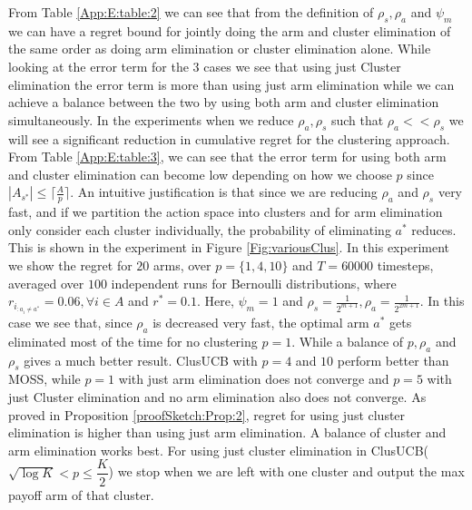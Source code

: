 \begin{remark}
\begin{table}
\begin{center}
\begin{tabular}{p{1.4cm}p{10.2cm}p{3.5cm}}
\end{tabular}
\end{center}	
\end{table}
 From Table \ref{App:E:table:2} we can see that from the definition of $\rho_{s},\rho_{a}$ and $\psi_{m}$ we can have a regret bound for jointly doing the arm and cluster elimination of the same order as doing arm elimination or cluster elimination alone. While looking at the error term for the $3$ cases we see that using just Cluster elimination  the error term is more than using just arm elimination while we can achieve a balance between the two by using both arm and cluster elimination simultaneously. In the experiments when we reduce $\rho_{a}, \rho_{s}$ such that $\rho_{a}<<\rho_{s}$ we will see a significant reduction in cumulative regret for the clustering approach. From Table \ref{App:E:table:3}, we can see that the error term for using both arm and cluster elimination can become low depending on how we choose $p$ since $|A_{s^{*}}|\leq \lceil\frac{A}{p}\rceil$. An intuitive justification is that since we are reducing $\rho_{a}$ and $\rho_{s}$ very fast, and if we partition the action space into clusters and for arm elimination only consider each cluster individually, the probability of eliminating $a^{*}$ reduces. 
 This is shown in the experiment in Figure \ref{Fig:variousClus}. In this experiment we show the regret for $20$ arms, over $p=\lbrace 1,4,10\rbrace$ and $T=60000$ timesteps, averaged over $100$ independent runs for Bernoulli distributions, where $r_{i_{:{a_{i}\neq a^{*}}}}=0.06,\forall i\in A$ and $r^{*}=0.1$. Here, $\psi_{m}=1$ and $\rho_{s}=\frac{1}{2^{m+1}},\rho_{a}=\frac{1}{2^{2m+1}}$. In this case we see that, since $\rho_{a}$ is decreased very fast, the optimal arm $a^{*}$ gets eliminated most of the time for no clustering $p=1$. While a balance of $p,\rho_{a}$ and $\rho_{s}$ gives a much better result. ClusUCB with $p=4$ and $10$ perform better than MOSS, while $p=1$ with just arm elimination does not converge and $p=5$ with just Cluster elimination and no arm elimination also does not converge. As proved in Proposition \ref{proofSketch:Prop:2}, regret for using just cluster elimination is higher than using just arm elimination. A balance of cluster and arm elimination works best. For using just cluster elimination in ClusUCB($\sqrt{\log K}<p\leq \dfrac{K}{2}$) we stop when we are left with one cluster and output the max payoff arm of that cluster.


\end{remark}
